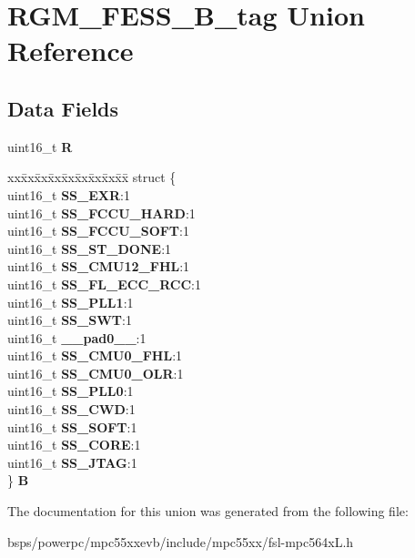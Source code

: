 \hypertarget{unionRGM__FESS__16B__tag}{}\section{R\+G\+M\+\_\+\+F\+E\+S\+S\+\_\+B\+\_\+tag Union Reference}
\label{unionRGM__FESS__16B__tag}
\subsection*{Data Fields}
\begin{DoxyCompactItemize}
\item 
\mbox{\label{unionRGM__FESS__16B__tag_a720122eb0c2d0a04605fae6c4b5eb14d}} 
uint16\+\_\+t {\bfseries R}
\item 
\mbox{\label{unionRGM__FESS__16B__tag_a9ac4249afb0750df2ed18f4602c5324b}} 
\begin{tabbing}
xx\=xx\=xx\=xx\=xx\=xx\=xx\=xx\=xx\=\kill
struct \{\\
\>uint16\_t {\bfseries SS\_EXR}:1\\
\>uint16\_t {\bfseries SS\_FCCU\_HARD}:1\\
\>uint16\_t {\bfseries SS\_FCCU\_SOFT}:1\\
\>uint16\_t {\bfseries SS\_ST\_DONE}:1\\
\>uint16\_t {\bfseries SS\_CMU12\_FHL}:1\\
\>uint16\_t {\bfseries SS\_FL\_ECC\_RCC}:1\\
\>uint16\_t {\bfseries SS\_PLL1}:1\\
\>uint16\_t {\bfseries SS\_SWT}:1\\
\>uint16\_t {\bfseries \_\_pad0\_\_}:1\\
\>uint16\_t {\bfseries SS\_CMU0\_FHL}:1\\
\>uint16\_t {\bfseries SS\_CMU0\_OLR}:1\\
\>uint16\_t {\bfseries SS\_PLL0}:1\\
\>uint16\_t {\bfseries SS\_CWD}:1\\
\>uint16\_t {\bfseries SS\_SOFT}:1\\
\>uint16\_t {\bfseries SS\_CORE}:1\\
\>uint16\_t {\bfseries SS\_JTAG}:1\\
\} {\bfseries B}\\

\end{tabbing}\end{DoxyCompactItemize}


The documentation for this union was generated from the following file\+:\begin{DoxyCompactItemize}
\item 
bsps/powerpc/mpc55xxevb/include/mpc55xx/fsl-\/mpc564x\+L.\+h\end{DoxyCompactItemize}
